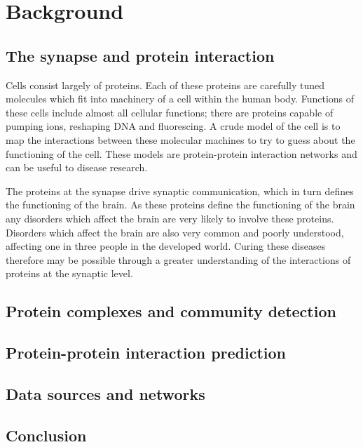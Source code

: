 \chapter{Background}
\label{background}

\lipsum[1]


\section{The synapse and protein interaction}

Cells consist largely of proteins.
Each of these proteins are carefully tuned molecules which fit into machinery of a cell within the human body.
Functions of these cells include almost all cellular functions; there are proteins capable of pumping ions, reshaping DNA and fluorescing\cite{alberts_molecular_2008}.
A crude model of the cell is to map the interactions between these molecular machines to try to guess about the functioning of the cell.
These models are protein-protein interaction networks and can be useful to disease research.

The proteins at the synapse drive synaptic communication, which in turn defines the functioning of the brain.
As these proteins define the functioning of the brain any disorders which affect the brain are very likely to involve these proteins.
Disorders which affect the brain are also very common and poorly understood, affecting one in three people in the developed world\cite{citation_needed}.
Curing these diseases therefore may be possible through a greater understanding of the interactions of proteins at the synaptic level\cites{synsys,chua_architecture_2010}.



\section{Protein complexes and community detection}

\lipsum[4-8]


\section{Protein-protein interaction prediction}

\lipsum[3-10]



\section{Data sources and networks}

\lipsum[11-15]

\section*{Conclusion}

\lipsum[16]
